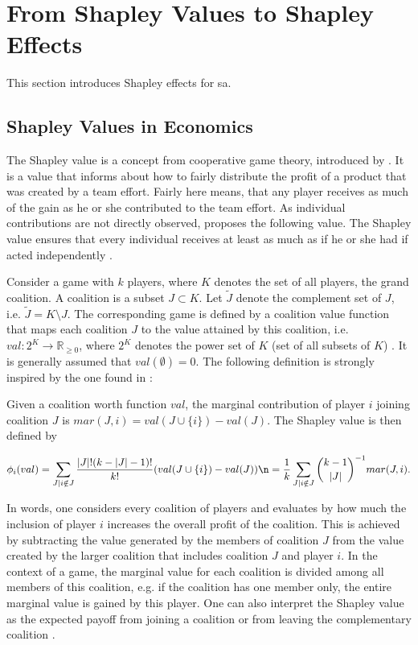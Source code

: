 \section{From Shapley Values to Shapley Effects}

This section introduces Shapley effects for sa.

\subsection{Shapley Values in Economics}

The Shapley value is a concept from cooperative game theory, introduced by \cite{S53}. It is a value that informs about how to fairly distribute the profit of a product that was created by a team effort. Fairly here means, that any player receives as much of the gain as he or she contributed to the team effort. As individual contributions are not directly observed, \cite{S53} proposes the following value. The Shapley value ensures that every individual receives at least as much as if he or she had if acted independently \cite{IP19}.

Consider a game with $k$ players, where $K$ denotes the set of all players, the grand coalition. A coalition is a subset $J \subset K$. Let $\tilde J$ denote the complement set of $J$, i.e. $\tilde J = K \setminus{J}$. The corresponding game is defined by a coalition value function that maps each coalition $J$ to the value attained by this coalition, i.e. $val: 2^K \to \mathbb{R}_{\geq 0}$, where $2^K$ denotes the power set of $K$ (set of all subsets of $K$) \cite{SNS16}. It is generally assumed that $val(\emptyset) = 0$. The following definition is strongly inspired by the one found in \cite{PRB20}:

\begin{definition}

Given a coalition worth function $val$, the marginal contribution of player $i$ joining coalition $J$ is $mar(J, i)=val(J \cup \{i\}) - val(J)$. The Shapley value is then defined by

\begin{equation}
\phi_{i} (val) = \sum_{J \mid i \notin J} \frac{\vert J \vert ! (k - \vert J \vert - 1) ! }{ k !} (val(J \cup \{i\}) - val(J)) \n = \frac{1}{k} \sum_{J \mid i \notin J} \binom{k-1}{\vert J \vert}^{-1} mar(J, i).
\end{equation}

\end{definition}

In words, one considers every coalition of players and evaluates by how much the inclusion of player $i$ increases the overall profit of the coalition. This is achieved by subtracting the value generated by the members of coalition $J$ from the value created by the larger coalition that includes coalition $J$ and player $i$. In the context of a game, the marginal value for each coalition is divided among all members of this coalition, e.g. if the coalition has one member only, the entire marginal value is gained by this player. One can also interpret the Shapley value as the expected payoff from joining a coalition or from leaving the complementary coalition \cite{PRB20}.

